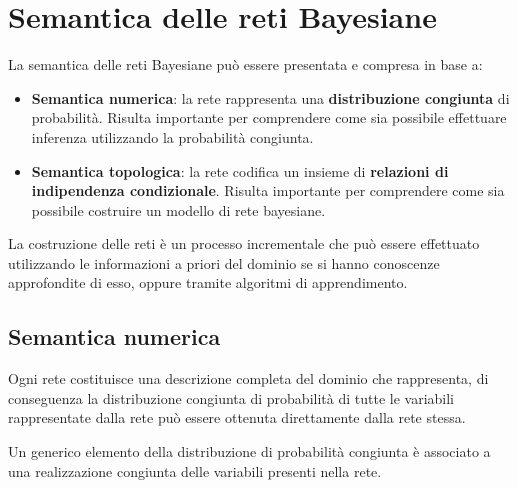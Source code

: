 \section{Semantica delle reti Bayesiane}
La semantica delle reti Bayesiane può essere presentata e compresa in base a:
\begin{itemize}
    \item \textbf{Semantica numerica}: la rete rappresenta una \textbf{distribuzione
              congiunta} di probabilità. Risulta importante per comprendere come
          sia possibile effettuare inferenza utilizzando la probabilità congiunta.
    \item \textbf{Semantica topologica}: la rete codifica un insieme di
          \textbf{relazioni di indipendenza condizionale}. Risulta importante per
          comprendere come sia possibile costruire un modello di
          rete bayesiane.
\end{itemize}
La costruzione delle reti è un processo incrementale che può essere effettuato
utilizzando le informazioni a priori del dominio se si hanno conoscenze
approfondite di esso, oppure tramite algoritmi di apprendimento.
\subsection{Semantica numerica}
Ogni rete costituisce una descrizione completa del dominio che rappresenta, di
conseguenza la distribuzione congiunta di probabilità di tutte le variabili
rappresentate dalla rete può essere ottenuta direttamente dalla rete stessa.

Un generico elemento della distribuzione di probabilità congiunta è associato a
una realizzazione congiunta delle variabili presenti nella rete.

